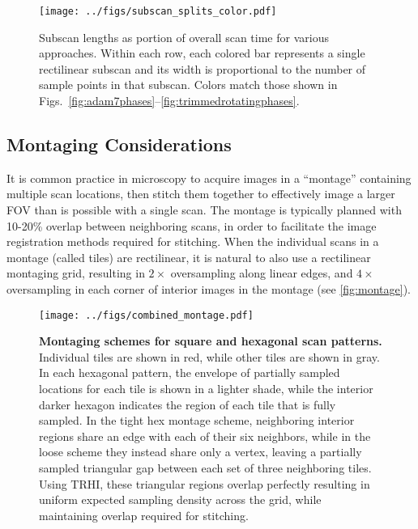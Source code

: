 \documentclass[aip, amsmath, amssymb, nobibnotes, nofootinbib, citeautoscript, reprint, superscriptaddress]{revtex4-1}
\begin{document}
    \begin{figure*}
        \centering
        \texttt{[image: ../figs/subscan\_splits\_color.pdf]}
        \caption{
        \label{fig:subscanlengths} 
        Subscan lengths as portion of overall scan time for various approaches.
        Within each row, each colored bar represents a single rectilinear subscan and its width is proportional to the number of sample points in that subscan.
            Colors match those shown in
            Figs.~\autoref{fig:adam7phases}--\autoref{fig:trimmedrotatingphases}.
        }
    \end{figure*}


    \subsection{Montaging Considerations}
    \label{sec:montaging}

    It is common practice in microscopy to acquire images in a ``montage'' containing multiple scan locations, then stitch them together to
    effectively image a larger FOV than is possible with a single scan.
    The montage is typically planned with 10-20\% overlap between neighboring scans, in order to facilitate the image registration methods required for stitching.
    When the individual scans in a montage (called tiles) are rectilinear, it is natural to also use a rectilinear montaging grid, resulting in $\mathrm{2\times}$ oversampling along linear edges, and $\mathrm{4\times}$ oversampling in each corner of interior images in the montage (see \autoref{fig:montage}).

    \begin{figure*}
        \centering
        \texttt{[image: ../figs/combined\_montage.pdf]}
        \caption{
            \label{fig:montage}\textbf{Montaging schemes for square and hexagonal scan patterns.}
            Individual tiles are shown in red, while other tiles are shown in gray.
            In each hexagonal pattern, the envelope of partially sampled locations for each tile is shown in a lighter shade, while the interior darker hexagon indicates the region of each tile that is fully sampled.
            In the tight hex montage scheme, neighboring interior regions share an edge with each of their six neighbors, while in the loose scheme they instead share only a vertex, leaving a partially sampled triangular gap between each set of three neighboring tiles.
            Using TRHI, these triangular regions overlap perfectly resulting in uniform expected sampling density across the grid, while maintaining overlap required for stitching.
            }
    \end{figure*}
\end{document}
